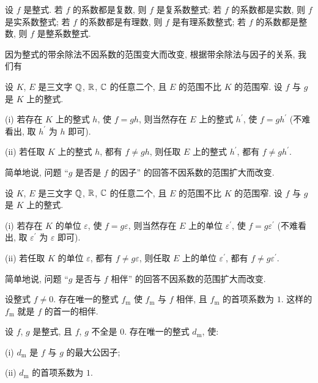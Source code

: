 \begin{definition}
    设 $f$ 是整式. 若 $f$ 的系数都是复数, 则 $f$ 是复系数整式; 若 $f$ 的系数都是实数, 则 $f$ 是实系数整式; 若 $f$ 的系数都是有理数, 则 $f$ 是有理系数整式; 若 $f$ 的系数都是整数, 则 $f$ 是整系数整式.
\end{definition}

因为整式的带余除法不因系数的范围变大而改变, 根据带余除法与因子的关系, 我们有
\begin{proposition}
    设 $K$, $E$ 是三文字 $\mathbb{Q}$, $\mathbb{R}$, $\mathbb{C}$ 的任意二个, 且 $E$ 的范围不比 $K$ 的范围窄. 设 $f$ 与 $g$ 是 $K$ 上的整式.

    (i) 若存在 $K$ 上的整式 $h$, 使 $f = gh$, 则当然存在 $E$ 上的整式 $h^{\prime}$, 使 $f = gh^{\prime}$ (不难看出, 取 $h^{\prime}$ 为 $h$ 即可).

    (ii) 若任取 $K$ 上的整式 $h$, 都有 $f \neq gh$, 则任取 $E$ 上的整式 $h^{\prime}$, 都有 $f \neq gh^{\prime}$.

    简单地说, 问题 ``$g$ 是否是 $f$ 的因子'' 的回答不因系数的范围扩大而改变.
\end{proposition}

\begin{proposition}
    设 $K$, $E$ 是三文字 $\mathbb{Q}$, $\mathbb{R}$, $\mathbb{C}$ 的任意二个, 且 $E$ 的范围不比 $K$ 的范围窄. 设 $f$ 与 $g$ 是 $K$ 上的整式.

    (i) 若存在 $K$ 的单位 $\varepsilon$, 使 $f = g\varepsilon$, 则当然存在 $E$ 上的单位 $\varepsilon^{\prime}$, 使 $f = g\varepsilon^{\prime}$ (不难看出, 取 $\varepsilon^{\prime}$ 为 $\varepsilon$ 即可).

    (ii) 若任取 $K$ 的单位 $\varepsilon$, 都有 $f \neq g\varepsilon$, 则任取 $E$ 上的单位 $\varepsilon^{\prime}$, 都有 $f \neq g\varepsilon^{\prime}$.

    简单地说, 问题 ``$g$ 是否与 $f$ 相伴'' 的回答不因系数的范围扩大而改变.
\end{proposition}

\begin{proposition}
    设整式 $f \neq 0$. 存在唯一的整式 $f_\mathrm{m}$ 使 $f_\mathrm{m}$ 与 $f$ 相伴, 且 $f_\mathrm{m}$ 的首项系数为 $1$. 这样的 $f_\mathrm{m}$ 就是 $f$ 的首一的相伴.
\end{proposition}

\begin{proposition}
    设 $f$, $g$ 是整式, 且 $f$, $g$ 不全是 $0$. 存在唯一的整式 $d_\mathrm{m}$, 使:

    (i) $d_\mathrm{m}$ 是 $f$ 与 $g$ 的最大公因子;

    (ii) $d_\mathrm{m}$ 的首项系数为 $1$.
\end{proposition}

